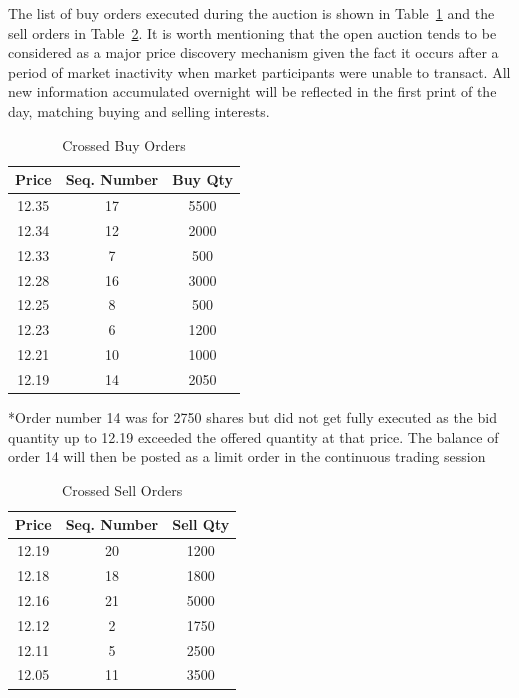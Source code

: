 The list of buy orders executed during the auction is shown in Table~\ref{tab:openAuct4} and the sell orders in Table~\ref{tab:openAuct5}. It is worth mentioning that the open auction tends to be considered as a major price discovery mechanism given the fact it occurs after a period of market inactivity when market participants were unable to transact. All new information accumulated overnight will be reflected in the first print of the day, matching buying and selling interests.  

\begin{table}[!ht]
   \centering
   \caption{Crossed Buy Orders\label{tab:openAuct4}}
   \begin{tabular}{ccc} 
	Price & Seq. Number & Buy Qty  \\ \hline
	12.35 &  17 & 5500 \\
	12.34 & 12 & 2000\\	
	12.33 & 7  & 500\\			
	12.28 &  16 & 3000\\	
	12.25 & 8 & 500\\	
	12.23 & 6 & 1200\\		
	12.21  & 10& 1000\\		
	12.19 &  14  & 2050 		
   \end{tabular}
\begin{minipage}[t]{1\textwidth}
\small{*Order number 14 was for 2750 shares but did not get fully executed as the bid quantity up to 12.19 exceeded the offered quantity at that price. The balance of order 14 will then be posted as a limit order in the continuous trading session}
\end{minipage}   
\end{table}

	
\begin{table}[!ht]
   \centering
   \caption{Crossed Sell Orders\label{tab:openAuct5}}
   \begin{tabular}{ccc} 
	Price & Seq. Number & Sell Qty  \\ \hline
	12.19 &  20 & 1200 \\
	12.18 &  18 & 1800 \\
	12.16 &  21 & 5000 \\
	12.12 & 2 & 1750 \\		
	12.11 & 5 & 2500 \\				
	12.05 & 11 & 3500 		
   \end{tabular}
\end{table}	


